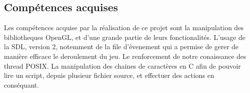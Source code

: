 \subsection{Compétences acquises}
	Les compétences acquise par la réalisation de ce projet sont la manipulation des bibliotheques OpenGL, et d'une grande partie de leurs fonctionalités.
	L'usage de la SDL, version 2, notemment de la file d'êvenement qui a permise de gerer de manière efficace le deroulement du jeu.
	Le renforcement de notre conaissance des thread POSIX.
	La manipulation des chaines de caractères en C afin de pouvoir lire un script, depuis plusieur fichier source, et effectuer des actions en conséquant.